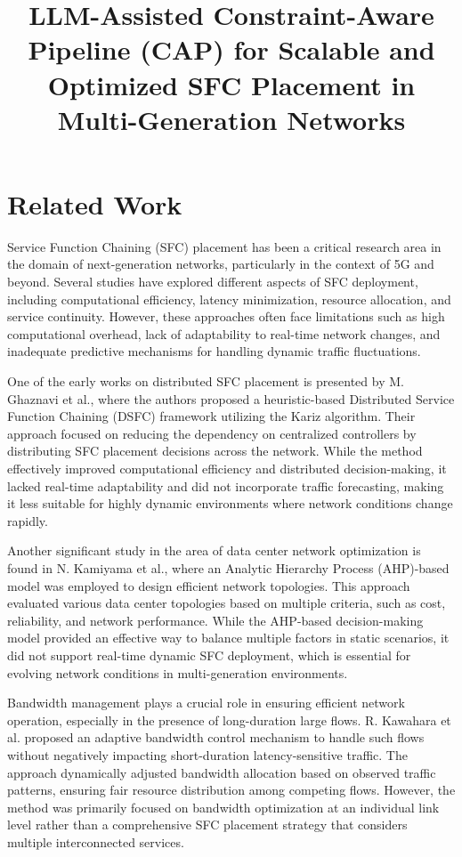 \documentclass[conference]{IEEEtran}
\title{LLM-Assisted Constraint-Aware Pipeline (CAP) for Scalable and Optimized SFC Placement in Multi-Generation Networks}
\author{
	\IEEEauthorblockN{Author 1, Author 2, Author 3, Author 4}
	\IEEEauthorblockA{Department of Computer Science, University Name, Country\\
		Email: author1@example.com, author2@example.com, author3@example.com, author4@example.com}
}
\begin{document}
	
	\maketitle
	
	\section{Related Work}
	
	Service Function Chaining (SFC) placement has been a critical research area in the domain of next-generation networks, particularly in the context of 5G and beyond. Several studies have explored different aspects of SFC deployment, including computational efficiency, latency minimization, resource allocation, and service continuity. However, these approaches often face limitations such as high computational overhead, lack of adaptability to real-time network changes, and inadequate predictive mechanisms for handling dynamic traffic fluctuations.
	
	One of the early works on distributed SFC placement is presented by M. Ghaznavi et al., where the authors proposed a heuristic-based Distributed Service Function Chaining (DSFC) framework utilizing the Kariz algorithm. Their approach focused on reducing the dependency on centralized controllers by distributing SFC placement decisions across the network. While the method effectively improved computational efficiency and distributed decision-making, it lacked real-time adaptability and did not incorporate traffic forecasting, making it less suitable for highly dynamic environments where network conditions change rapidly.
	
	Another significant study in the area of data center network optimization is found in N. Kamiyama et al., where an Analytic Hierarchy Process (AHP)-based model was employed to design efficient network topologies. This approach evaluated various data center topologies based on multiple criteria, such as cost, reliability, and network performance. While the AHP-based decision-making model provided an effective way to balance multiple factors in static scenarios, it did not support real-time dynamic SFC deployment, which is essential for evolving network conditions in multi-generation environments.
	
	Bandwidth management plays a crucial role in ensuring efficient network operation, especially in the presence of long-duration large flows. R. Kawahara et al. proposed an adaptive bandwidth control mechanism to handle such flows without negatively impacting short-duration latency-sensitive traffic. The approach dynamically adjusted bandwidth allocation based on observed traffic patterns, ensuring fair resource distribution among competing flows. However, the method was primarily focused on bandwidth optimization at an individual link level rather than a comprehensive SFC placement strategy that considers multiple interconnected services.
	
\end{document}

